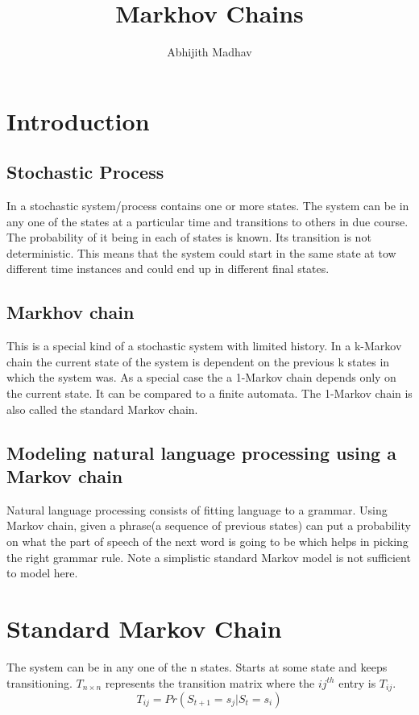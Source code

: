 \documentclass[12pt]{article}
\title{\textbf{Markhov Chains}}
\author{Abhijith Madhav}
\date{}
\begin{document}
\maketitle

\section{Introduction}

\subsection{Stochastic Process}
In a stochastic system/process contains one or more states. The system can be in any one of the states at a particular time and transitions to others in due course. The probability of it being in each of states is known. Its transition is not deterministic. This means that the system could start in the same state at tow different time instances and could end up in different final states.

\subsection{Markhov chain}
This is a special kind of a stochastic system with limited history. In a k-Markov chain the current state of the system is dependent on the previous k states in which the system was. As a special case the a 1-Markov chain depends only on the current state. It can be compared to a finite automata. The 1-Markov chain is also called the standard Markov chain.


\subsection{Modeling natural language processing using a Markov chain}
Natural language processing consists of fitting language to a grammar. Using Markov chain, given a phrase(a sequence of previous states) can put a probability on what the part of speech of the next word is going to be which helps in picking the right grammar rule. Note a simplistic standard Markov model is not sufficient to model here.


\section{Standard Markov Chain}
The system can be in any one of the n states. Starts at some state and keeps transitioning. $T_{n \times n}$ represents the transition matrix where the $ij^{th}$ entry is $T_{ij}$.
$$ T_{ij} = Pr(S_{t+1} = s_j | S_t = s_i)$$
\end{document}
